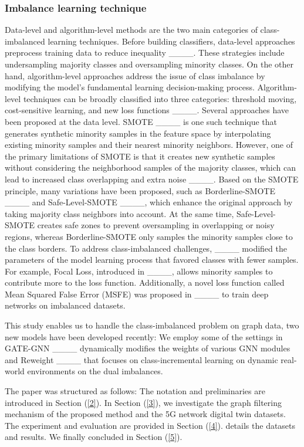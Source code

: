 \subsubsection{Imbalance learning technique}
    Data-level and algorithm-level methods are the two main categories of class-imbalanced learning techniques. Before building classifiers, data-level approaches preprocess training data to reduce inequality ____. These strategies include undersampling majority classes and oversampling minority classes. On the other hand, algorithm-level approaches address the issue of class imbalance by modifying the model's fundamental learning decision-making process. Algorithm-level techniques can be broadly classified into three categories: threshold moving, cost-sensitive learning, and new loss functions ____. Several approaches have been proposed at the data level. SMOTE ____ is one such technique that generates synthetic minority samples in the feature space by interpolating existing minority samples and their nearest minority neighbors. However, one of the primary limitations of SMOTE is that it creates new synthetic samples without considering the neighborhood samples of the majority classes, which can lead to increased class overlapping and extra noise ____. Based on the SMOTE principle, many variations have been proposed, such as Borderline-SMOTE ____ and Safe-Level-SMOTE ____, which enhance the original approach by taking majority class neighbors into account. At the same time, Safe-Level-SMOTE creates safe zones to prevent oversampling in overlapping or noisy regions, whereas Borderline-SMOTE only samples the minority samples close to the class borders. To address class-imbalanced challenges, ____ modified the parameters of the model learning process that favored classes with fewer samples. For example, Focal Loss, introduced in ____, allows minority samples to contribute more to the loss function. Additionally, a novel loss function called Mean Squared False Error (MSFE) was proposed in ____ to train deep networks on imbalanced datasets.
    
    This study enables us to handle the class-imbalanced problem on graph data, two new models have been developed recently: We employ some of the settings in GATE-GNN ____ dynamically modifies the weights of various GNN modules and Reweight ____ that focuses on class-incremental learning on dynamic real-world environments on the dual imbalances.

The paper was structured as follows: The notation and preliminaries are introduced in Section (\ref{2}). In Section (\ref{3}), we investigate the graph filtering mechanism of the proposed method and the 5G network digital twin datasets. The experiment and evaluation are provided in Section (\ref{4}). details the datasets and results. We finally concluded in Section (\ref{5}).